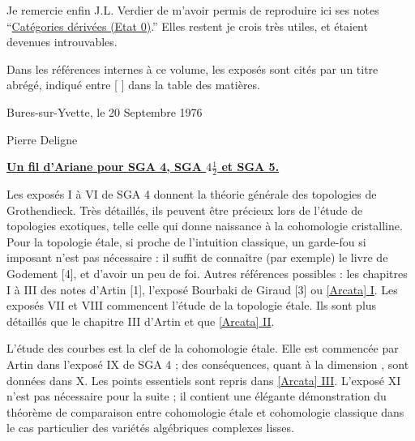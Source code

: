 Je remercie enfin J.L. Verdier de m'avoir permis de reproduire ici ses notes 
``\hyperref[VIII]{Catégories dérivées (Etat 0)}.'' Elles restent je crois très utiles, et 
étaient devenues introuvables. 

Dans les références internes à ce volume, les exposés sont cités par 
un titre abrégé, indiqué entre [ ] dans la table des matières. 

\vspace{20pt}
Bures-sur-Yvette, le 20 Septembre 1976

\vspace{5pt}
Pierre Deligne


\markboth{}{}
\thispagestyle{plain}
{}
\begin{center}
\textbf{\underline{Un fil d'Ariane pour SGA 4, SGA $4\frac12$ et SGA 5.}}
\end{center}
\label{Ariane}

Les exposés I à VI de SGA 4 donnent la théorie générale des topologies de
Grothendieck. Très détaillés, ils peuvent être précieux lors de l'étude de
topologies exotiques, telle celle qui donne naissance à la cohomologie
cristalline. Pour la topologie étale, si proche de l'intuition classique, un
garde-fou si imposant n'est pas nécessaire : il suffit de connaître (par
exemple) le livre de Godement [4], et d'avoir un peu de foi. Autres références
possibles : les chapitres I à III des notes d'Artin [1], l'exposé Bourbaki de
Giraud [3] ou \hyperref[I:1]{[Arcata] I}. Les exposés VII et VIII commencent
l'étude de la topologie étale. Ils sont plus détaillés que le chapitre III
d'Artin et que \hyperref[I:2]{[Arcata] II}.

L'étude des courbes est la clef de la cohomologie étale. Elle est commencée par
Artin dans l'exposé IX de SGA 4 ; des conséquences, quant à la dimension
, sont données dans X. Les points essentiels sont repris dans
\hyperref[I:3]{[Arcata] III}. L'exposé XI n'est pas nécessaire pour la suite ;
il contient une élégante démonstration du théorème de comparaison entre
cohomologie étale et cohomologie classique dans le cas particulier des variétés
algébriques complexes lisses.

